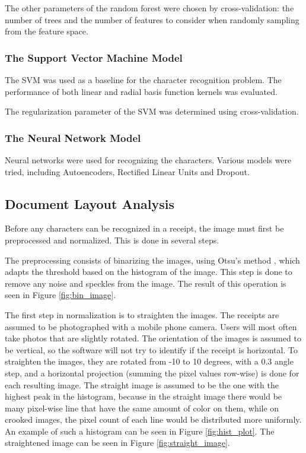 The other parameters of the random forest were chosen by cross-validation: the number of trees and the number of features to consider when randomly sampling from the feature space. 

\subsubsection{The Support Vector Machine Model}
The SVM was used as a baseline for the character recognition problem. The performance of both linear and radial basis function kernels was evaluated. 

The regularization parameter of the SVM was determined using cross-validation. 

\subsubsection{The Neural Network Model}
Neural networks were used for recognizing the characters. Various models were tried, including Autoencoders, Rectified Linear Units and Dropout. 


\subsection{Document Layout Analysis}
Before any characters can be recognized in a receipt, the image must first be preprocessed and normalized. This is done in several steps. 

The preprocessing consists of binarizing the images, using Otsu's method \cite{otsu1975threshold}, which adapts the threshold based on the histogram of the image. This step is done to remove any noise and speckles from the image. The result of this operation is seen in Figure \ref{fig:bin_image}.

The first step in normalization is to straighten the images. The receipts are assumed to be photographed with a mobile phone camera. Users will most often take photos that are slightly rotated. The orientation of the images is assumed to be vertical, so the software will not try to identify if the receipt is horizontal. To straighten the images, they are rotated from -10 to 10 degrees, with a 0.3 angle step, and a horizontal projection (summing the pixel values row-wise) is done for each resulting image. The straight image is assumed to be the one with the highest peak in the histogram, because in the straight image there would be many pixel-wise line that have the same amount of color on them, while on crooked images, the pixel count of each line would be distributed more uniformly. An example of such a histogram can be seen in Figure \ref{fig:hist_plot}. The straightened image can be seen in Figure \ref{fig:straight_image}.

